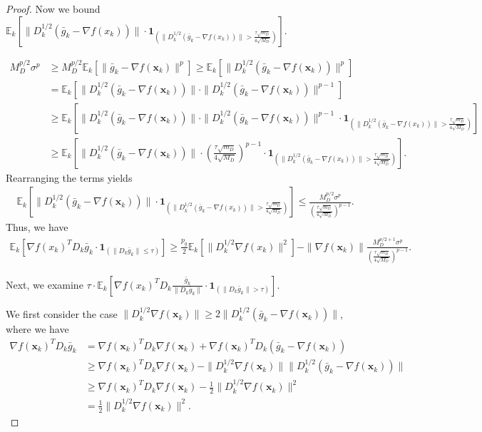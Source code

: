 \documentclass{article}
\newcommand{\bx}{\boldsymbol{x}}
\newcommand{\barg}{\bar{g}}
\theoremstyle{plain}
\theoremstyle{definition}
\theoremstyle{remark}
\begin{document}
\begin{proof}
Now we bound $\mathbb{E}_k[\|D_k^{1/2} (\bar{g}_k - \nabla f(x_k))\| \cdot \boldsymbol{1}_{(\|D_k^{1/2}(\bar{g}_k - \nabla f(x_k))\|> \frac{\tau\sqrt{m_D}}{4\sqrt{M_D}})}]$.

\begin{align*}
    M_D^{p/2} \sigma^p & \geq M_D^{p/2}\mathbb{E}_k[\|\barg_k-\nabla f(\bx_k)\|^p]\geq \mathbb{E}_k[\|D_k^{1/2}(\barg_k-\nabla f(\bx_k))\|^p] \\
    & = \mathbb{E}_k[\|D_k^{1/2}(\barg_k-\nabla f(\bx_k))\| \cdot \|D_k^{1/2}(\barg_k-\nabla f(\bx_k))\|^{p-1}] \\
    & \geq \mathbb{E}_k[\|D_k^{1/2}(\barg_k-\nabla f(\bx_k))\| \cdot \|D_k^{1/2}(\barg_k-\nabla f(\bx_k))\|^{p-1}\cdot \boldsymbol{1}_{(\|D_k^{1/2}(\bar{g}_k - \nabla f(x_k))\|> \frac{\tau\sqrt{m_D}}{4\sqrt{M_D}})}] \\
    & \geq \mathbb{E}_k[\|D_k^{1/2}(\barg_k-\nabla f(\bx_k))\| \cdot \left(\frac{\tau\sqrt{m_D}}{4\sqrt{M_D}}\right)^{p-1}\cdot \boldsymbol{1}_{(\|D_k^{1/2}(\bar{g}_k - \nabla f(x_k))\|> \frac{\tau\sqrt{m_D}}{4\sqrt{M_D}})}].
\end{align*}
Rearranging the terms yields
\begin{align*}
    \mathbb{E}_k[\|D_k^{1/2}(\barg_k-\nabla f(\bx_k))\|  \cdot \boldsymbol{1}_{(\|D_k^{1/2}(\bar{g}_k - \nabla f(x_k))\|> \frac{\tau\sqrt{m_D}}{4\sqrt{M_D}})}] \leq \frac{M_D^{p/2} \sigma^p}{\left(\frac{\tau\sqrt{m_D}}{4\sqrt{M_D}}\right)^{p-1}}.
\end{align*}
Thus, we have
\begin{align*}
    \mathbb{E}_k[\nabla f(x_k)^T D_k \bar{g}_k \cdot \boldsymbol{1}_{(\|D_k\bar{g}_k\| \le \tau)}]
    \geq \frac{p_g}{2}\mathbb{E}_k[\| D_k^{1/2} \nabla f(x_k)\|^2] -  \|\nabla f(\bx_k)\|\frac{M_D^{p/2+1} \sigma^p}{\left(\frac{\tau\sqrt{m_D}}{4\sqrt{M_D}}\right)^{p-1}}.
\end{align*}

Next, we examine $\tau \cdot \mathbb{E}_k\left[\nabla f(x_k)^T D_k \frac{\bar{g}_k}{\|D_k\bar{g}_k\|} \cdot \boldsymbol{1}_{(\|D_k\bar{g}_k\| > \tau)} \right]$.

We first consider the case $\|D_k^{1/2}\nabla f(\bx_k)\|\geq 2\|D_k^{1/2}(\barg_k-\nabla f(\bx_k))\|$, where we have
\begin{align*}
    \nabla f(\bx_k)^TD_k\barg_k 
    &= \nabla f(\bx_k)^TD_k\nabla f(\bx_k) +\nabla f(\bx_k)^TD_k (\barg_k - \nabla f(\bx_k)) \\
    & \geq \nabla f(\bx_k)^TD_k\nabla f(\bx_k) - \|D_k^{1/2}\nabla f(\bx_k)\|\|D_k^{1/2} (\barg_k - \nabla f(\bx_k))\| \\
    & \geq \nabla f(\bx_k)^TD_k\nabla f(\bx_k) - \frac{1}{2}\|D_k^{1/2}\nabla f(\bx_k)\|^2 \\
    & = \frac{1}{2}\|D_k^{1/2}\nabla f(\bx_k)\|^2.
\end{align*}


\end{proof}
\end{document}
